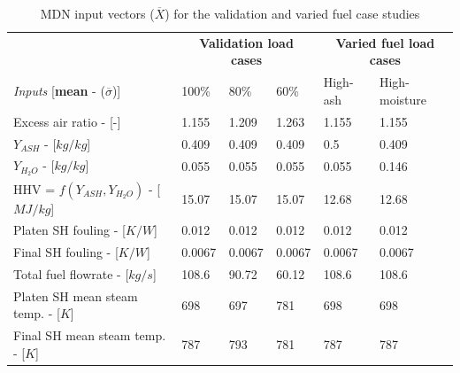 \documentclass[a4paper,fleqn]{cas-sc}
\begin{document}
\begin{table}[h!]
\caption{MDN input vectors ($\overline{X}$) for the validation and varied fuel case studies}\label{tbl_inputs}
\begin{tabular*}{\tblwidth}{lp{}p{}p{}p{}p{}}
\toprule
 & \multicolumn{3}{c}{\textbf{Validation load cases}}&\multicolumn{2}{c}{\textbf{Varied fuel load cases}}\\
\textit{Inputs} [\textbf{mean} - ($\overline{\sigma}$)]& 100\%  & 80\% & 60\% & High-ash & High-moisture  \\
\midrule
Excess air ratio - [-] & 1.155 & 1.209 & 1.263 & 1.155 & 1.155  \\
$Y_{ASH}$ - [$kg/kg$] & 0.409 & 0.409 &  0.409 &0.5 & 0.409 \\
$Y_{H_{2}O}$ - [$kg/kg$] & 0.055 & 0.055 & 0.055 & 0.055 & 0.146  \\
HHV = $f(Y_{ASH},Y_{H_{2}O})$ - [$MJ/kg$] & 15.07 & 15.07 & 15.07 & 12.68 & 12.68  \\
Platen SH fouling - [$K/W$]& 0.012 & 0.012 & 0.012 & 0.012 & 0.012  \\
Final SH fouling - [$K/W$] & 0.0067&0.0067 &0.0067 & 0.0067&0.0067  \\
Total fuel flowrate - [$kg/s$] &108.6 & 90.72 & 60.12 &108.6 & 108.6 \\
Platen SH mean steam temp. - [$K$] & 698 &697&781 &698 &698  \\
Final SH mean steam temp. - [$K$]& 787 & 793 &781 &787 &787  \\
\bottomrule
\end{tabular*}
\end{table}  
\end{document}
